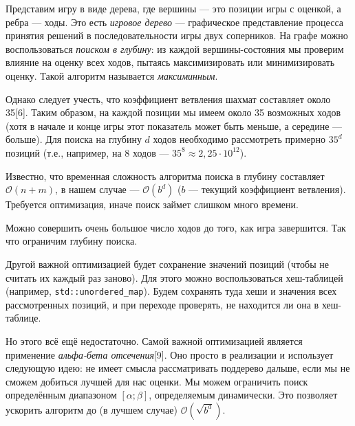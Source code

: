 {   	Представим игру в виде дерева, где вершины --- это позиции игры с оценкой, а ребра --- ходы. Это есть \textit{игровое дерево} --- графическое представление процесса принятия решений в последовательности игры двух соперников. На графе можно воспользоваться \textit{поиском в глубину}: из каждой вершины-состояния мы проверим влияние на оценку всех ходов, пытаясь максимизировать или минимизировать оценку. Такой алгоритм называется \textit{максиминным}.
	
	Однако следует учесть, что коэффициент ветвления шахмат составляет около 35[6]. Таким образом, на каждой позиции мы имеем около 35 возможных ходов (хотя в начале и конце игры этот показатель может быть меньше, а середине --- больше). Для поиска на глубину $d$ ходов необходимо рассмотреть примерно $35^{d}$ позиций (т.е., например, на $8$ ходов --- $35^{8} \approx 2,25\cdot10^{12}$).
	
	Известно, что временная сложность алгоритма поиска в глубину составляет $\mathcal{O}(n+m)$, в нашем случае --- $\mathcal{O}(b^{d})$ ($b$ --- текущий коэффициент ветвления). Требуется оптимизация, иначе поиск займет слишком много времени.
	
	Можно совершить очень большое число ходов до того, как игра завершится. Так что ограничим глубину поиска.
	
	Другой важной оптимизацией будет сохранение значений позиций (чтобы не считать их каждый раз заново). Для этого можно воспользоваться хеш-таблицей (например, \texttt{std::unordered\_map}). Будем сохранять туда хеши и значения всех рассмотренных позиций, и при переходе проверять, не находится ли она в хеш-таблице.
	
	Но этого всё ещё недостаточно. Самой важной оптимизацией является применение \textit{альфа-бета отсечения}[9]. Оно просто в реализации и использует следующую идею: не имеет смысла рассматривать поддерево дальше, если мы не сможем добиться лучшей для нас оценки. Мы можем ограничить поиск определённым диапазоном $[\alpha;\beta]$, определяемым динамически. Это позволяет ускорить алгоритм до (в лучшем случае) $\mathcal{O}(\sqrt{b^{d}})$.
	
	
}